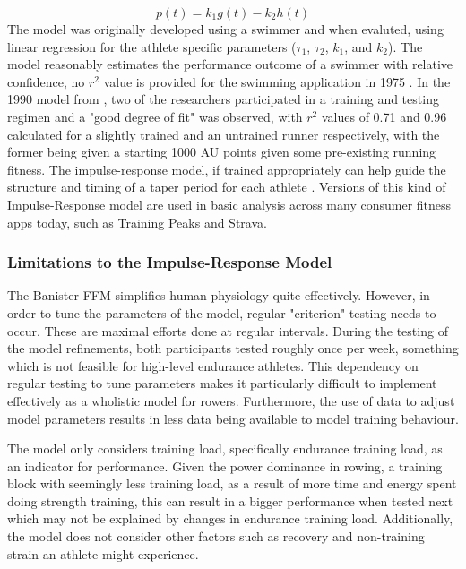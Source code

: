 \begin{equation}\label{eq:ban_perf}
  p(t) = k_1g(t)-k_2h(t)
\end{equation}
The model was originally developed using a swimmer and when evaluted, using linear regression for the athlete specific parameters ($\tau_1$, $\tau_2$, $k_1$, and $k_2$). The model reasonably estimates the performance outcome of a swimmer with relative confidence, no $r^2$ value is provided for the swimming application in 1975 \cite{Bannister1976}. In the 1990 model from \textcite{Morton1990}, two of the researchers participated in a training and testing regimen and a "good degree of fit" was observed, with $r^2$ values of 0.71 and 0.96 calculated for a slightly trained and an untrained runner respectively, with the former being given a starting 1000 AU points given some pre-existing running fitness. The impulse-response model, if trained appropriately can help guide the structure and timing of a taper period for each athlete \cite{Morton1990}.
Versions of this kind of Impulse-Response model are used in basic analysis across many consumer fitness apps today, such as Training Peaks and Strava.

\subsubsection{Limitations to the Impulse-Response Model}
The Banister FFM simplifies human physiology quite effectively. However, in order to tune the parameters of the model, regular "criterion" testing needs to occur. These are maximal efforts done at regular intervals. During the testing of the \textcite{Morton1990} model refinements, both participants tested roughly once per week, something which is not feasible for high-level endurance athletes. This dependency on regular testing to tune parameters makes it particularly difficult to implement effectively as a wholistic model for rowers. Furthermore, the use of data to adjust model parameters results in less data being available to model training behaviour.

The model only considers training load, specifically endurance training load, as an indicator for performance. Given the power dominance in rowing, a training block with seemingly less training load, as a result of more time and energy spent doing strength training, this can result in a bigger performance when tested next which may not be explained by changes in endurance training load. Additionally, the model does not consider other factors such as recovery and non-training strain an athlete might experience.

